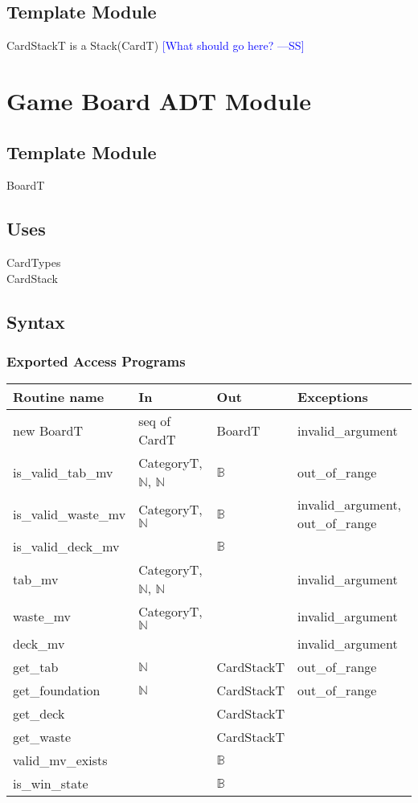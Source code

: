 \documentclass[12pt]{article}
\newcommand{\authornote}[3]{\textcolor{#1}{[#3 ---#2]}}
\newcommand{\authornote}[3]{}
\newcommand{\wss}[1]{\authornote{blue}{SS}{#1}}
\begin{document}
\subsection* {Template Module}

CardStackT is a Stack(CardT) \wss{What should go here?}

\newpage

\section* {Game Board ADT Module}

\subsection*{Template Module}

BoardT

\subsection* {Uses}

\noindent CardTypes\\
\noindent CardStack

\subsection* {Syntax}

\subsubsection* {Exported Access Programs}

\begin{tabular}{| l | l | l | l |}
\hline
\textbf{Routine name} & \textbf{In} & \textbf{Out} & \textbf{Exceptions}\\
\hline
new BoardT  & seq of CardT & BoardT & invalid\_argument\\
\hline
is\_valid\_tab\_mv & CategoryT, $\mathbb{N}$, $\mathbb{N}$ & $\mathbb{B}$ & out\_of\_range\\
\hline
is\_valid\_waste\_mv & CategoryT, $\mathbb{N}$ & $\mathbb{B}$ &
                                                                invalid\_argument, out\_of\_range\\
\hline
is\_valid\_deck\_mv &  &  $\mathbb{B}$ & \\
\hline
tab\_mv & CategoryT, $\mathbb{N}$, $\mathbb{N}$ & & invalid\_argument\\
\hline
waste\_mv & CategoryT, $\mathbb{N}$ & & invalid\_argument\\
\hline
deck\_mv &  & & invalid\_argument\\
\hline
get\_tab & $\mathbb{N}$ & CardStackT & out\_of\_range\\
\hline
get\_foundation & $\mathbb{N}$ & CardStackT & out\_of\_range\\
\hline
get\_deck &  & CardStackT & \\
\hline
get\_waste &  & CardStackT & \\
\hline
valid\_mv\_exists & & $\mathbb{B}$ &\\
\hline
is\_win\_state & & $\mathbb{B}$ & \\
\hline
\end{tabular}
\end{document}
